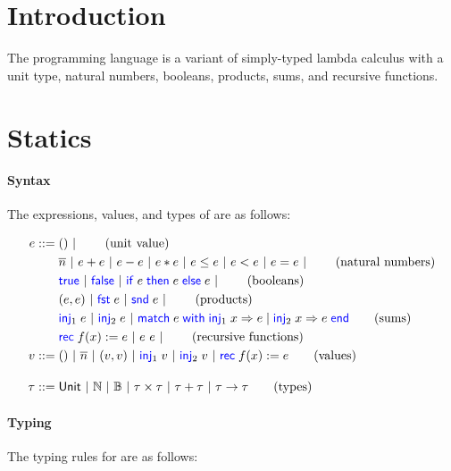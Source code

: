 \documentclass[10pt]{scrartcl}
\begin{document}
\author{Amin TImany}
\title{\simplelang{}}

\maketitle

\section{Introduction}
\label{sec:intro}
The programming language \simplelang{} is a variant of simply-typed lambda calculus with a unit type, natural numbers, booleans, products, sums, and recursive functions.

\section{Statics}
\label{sec:statics}

\paragraph{Syntax}
The expressions, values, and types of \simplelang{} are as follows:

\begin{align*}
  \expr \BNFdef{}
  & \TT \ALT \tag{unit value} \\
  & \Num{n} \ALT \expr + \expr \ALT \expr - \expr \ALT \expr * \expr \ALT \expr \le \expr \ALT \expr < \expr \ALT \expr = \expr \ALT \tag{natural numbers}\\
  & \True \ALT \False \ALT \If \expr then \expr\; \Else \expr \ALT \tag{booleans} \\
  & (\expr, \expr) \ALT \Fst \expr \ALT \Snd \expr \ALT \tag{products} \\
  & \Inj{1} \expr \ALT \Inj{2} \expr \ALT \Match \expr with \Inj{1} \var => \expr | \Inj{2} \var => \expr end \tag{sums}\\
  & \Rec f \var := \expr \ALT \expr~\expr \ALT \tag{recursive functions}\\
  \val \BNFdef{}
  & \TT \ALT \Num{n} \ALT (\val, \val) \ALT \Inj{1} \val \ALT \Inj{2} \val \ALT \Rec f \var := \expr \tag{values}\\[1em]
  \typ \BNFdef{}
  & \Tunit \ALT \Tnat \ALT \Tbool \ALT \typ \times \typ \ALT \typ + \typ \ALT \typ \to \typ \tag{types}
\end{align*}

\paragraph{Typing}
The typing rules for \simplelang{} are as follows:
\end{document}
